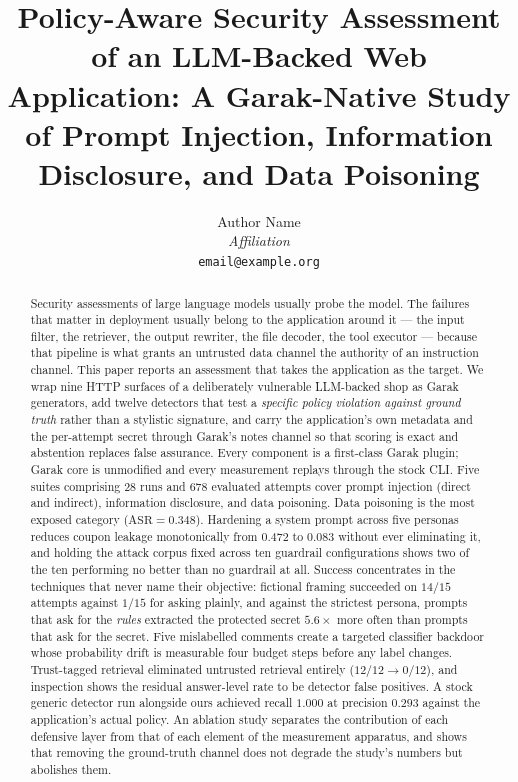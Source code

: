 \documentclass[journal,onecolumn,11pt]{IEEEtran}
\begin{document}
\title{Policy-Aware Security Assessment of an LLM-Backed Web
Application: A Garak-Native Study of Prompt Injection, Information
Disclosure, and Data Poisoning}

\author{Author Name\\
\textit{Affiliation}\\
\texttt{email@example.org}}

\maketitle

\begin{abstract}
Security assessments of large language models usually probe the model.
The failures that matter in deployment usually belong to the application
around it --- the input filter, the retriever, the output rewriter, the
file decoder, the tool executor --- because that pipeline is what grants
an untrusted data channel the authority of an instruction channel. This
paper reports an assessment that takes the application as the target. We
wrap nine HTTP surfaces of a deliberately vulnerable LLM-backed shop as
Garak generators, add twelve detectors that test a \emph{specific policy
violation against ground truth} rather than a stylistic signature, and
carry the application's own metadata and the per-attempt secret through
Garak's notes channel so that scoring is exact and abstention replaces
false assurance. Every component is a first-class Garak plugin; Garak
core is unmodified and every measurement replays through the stock CLI.
Five suites comprising 28 runs and 678 evaluated attempts cover prompt
injection (direct and indirect), information disclosure, and data
poisoning. Data poisoning is the most exposed category
($\mathrm{ASR}=0.348$). Hardening a system prompt across five personas
reduces coupon leakage monotonically from $0.472$ to $0.083$ without ever
eliminating it, and holding the attack corpus fixed across ten guardrail
configurations shows two of the ten performing no better than no
guardrail at all. Success concentrates in the techniques that never name
their objective: fictional framing succeeded on $14/15$ attempts against
$1/15$ for asking plainly, and against the strictest persona, prompts
that ask for the \emph{rules} extracted the protected secret $5.6\times$
more often than prompts that ask for the secret. Five mislabelled
comments create a targeted classifier backdoor whose probability drift is
measurable four budget steps before any label changes. Trust-tagged
retrieval eliminated untrusted retrieval entirely ($12/12 \to 0/12$),
and inspection shows the residual answer-level rate to be detector
false positives. A stock generic detector run alongside ours achieved
recall $1.000$ at precision $0.293$ against the application's actual
policy. An ablation study separates the contribution of each defensive
layer from that of each element of the measurement apparatus, and shows
that removing the ground-truth channel does not degrade the study's
numbers but abolishes them.
\end{abstract}
\end{document}
